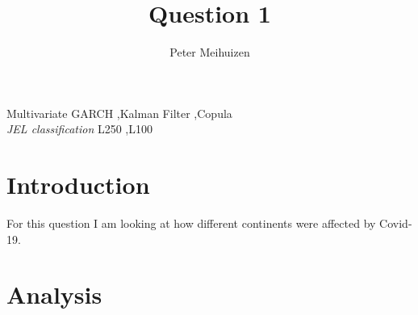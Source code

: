 \documentclass[11pt,preprint, authoryear]{elsarticle}
\numberwithin{equation}{section}
\numberwithin{figure}{section}
\numberwithin{table}{section}
\begin{document}
\begin{frontmatter}  %

\title{Question 1}





\author[Add1]{Peter Meihuizen}





\address[Add1]{Stellenbosch Univerity, South Africa}



\vspace{1cm}


\begin{keyword}
\footnotesize{
Multivariate GARCH \sep Kalman Filter \sep Copula \\
\vspace{0.3cm}
}
\footnotesize{
\textit{JEL classification} L250 \sep L100
}
\end{keyword}



\vspace{0.5cm}

\end{frontmatter}

\setcounter{footnote}{0}



\pagestyle{fancy}
\chead{}
\rhead{}
\lfoot{}
\lhead{}
\cfoot{}


\headsep 35pt %




\hypertarget{introduction}{%
\section{\texorpdfstring{Introduction
\label{Introduction}}{Introduction }}\label{introduction}}

For this question I am looking at how different continents were affected
by Covid-19.

\hypertarget{analysis}{%
\section{\texorpdfstring{Analysis
\label{Analysis}}{Analysis }}\label{analysis}}
\end{document}
